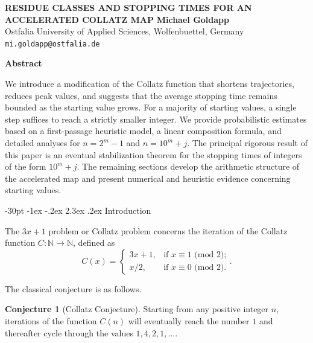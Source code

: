 \documentclass[11pt]{article}
\makeatletter
\renewcommand\section{\@startsection {section}{1}{\z@}
{-30pt \@plus -1ex \@minus -.2ex}
{2.3ex \@plus.2ex}
{\normalfont\normalsize\bfseries\boldmath}}
\theoremstyle{plain}
\theoremstyle{definition}
\newtheorem{conjecture}{Conjecture}
\theoremstyle{remark}
\makeatother
\begin{document}
 
\begin{center}
\uppercase{\bf\boldmath Residue Classes and Stopping Times for an Accelerated Collatz Map} 
\vskip20pt
{\bf Michael Goldapp}\\
{\smallit Ostfalia University of Applied Sciences, Wolfenbuettel, Germany}\\
{\tt mi.goldapp@ostfalia.de}
\end{center}

\vskip30pt

\centerline{\bf Abstract}
\noindent
We introduce a modification of the Collatz function that shortens trajectories, reduces peak values, and suggests 
that the average stopping time remains bounded as the starting value grows. 
For a majority of starting values, a single step suffices to reach a strictly smaller integer. 
We provide probabilistic estimates based on a first-passage heuristic model, 
a linear composition formula, and detailed analyses for $n = 2^m - 1$ and $n = 10^m + j$.
The principal rigorous result of this paper is an eventual stabilization theorem for the stopping times 
of integers of the form $10^m + j$. 
The remaining sections develop the arithmetic structure of the accelerated map and present numerical 
and heuristic evidence concerning starting values.

\pagestyle{myheadings}
 
\thispagestyle{empty}
\baselineskip=12.875pt
\vskip30pt

\section{Introduction}

The $3x+1$ problem or Collatz problem concerns the iteration of the Collatz function $C: \mathbb{N} \to \mathbb{N}$, defined as
\begin{displaymath}
C(x) = \begin{cases}
3x+1, & \text{if $x \equiv 1$ (mod $2$);}\\
x/2, & \text{if $x \equiv 0$ (mod $2$).}
\end{cases}.
\end{displaymath}

The classical conjecture is as follows.
\begin{conjecture}[Collatz Conjecture]
Starting from any positive integer $n$, iterations of the function $C(n)$ will eventually reach the number $1$ and thereafter cycle through the values $1, 4, 2, 1, \dots$.
\end{conjecture}
\end{document}
